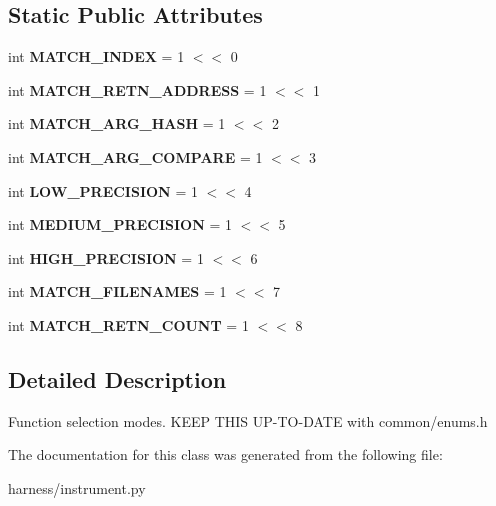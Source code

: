 \subsection*{Static Public Attributes}
\begin{DoxyCompactItemize}
\item 
\mbox{\label{classharness_1_1instrument_1_1_mode_add5468847be485ea5c5362ed9fec815b}} 
int {\bfseries M\+A\+T\+C\+H\+\_\+\+I\+N\+D\+EX} = 1 $<$$<$ 0
\item 
\mbox{\label{classharness_1_1instrument_1_1_mode_a361e316644f84d03585adabf031bb4ed}} 
int {\bfseries M\+A\+T\+C\+H\+\_\+\+R\+E\+T\+N\+\_\+\+A\+D\+D\+R\+E\+SS} = 1 $<$$<$ 1
\item 
\mbox{\label{classharness_1_1instrument_1_1_mode_a49e5431da8d0a3caa2901c6537d1e85a}} 
int {\bfseries M\+A\+T\+C\+H\+\_\+\+A\+R\+G\+\_\+\+H\+A\+SH} = 1 $<$$<$ 2
\item 
\mbox{\label{classharness_1_1instrument_1_1_mode_a3e45d63dc266f34a32296049643eb206}} 
int {\bfseries M\+A\+T\+C\+H\+\_\+\+A\+R\+G\+\_\+\+C\+O\+M\+P\+A\+RE} = 1 $<$$<$ 3
\item 
\mbox{\label{classharness_1_1instrument_1_1_mode_a70fe571b80851232c6535e54a5e5ab3a}} 
int {\bfseries L\+O\+W\+\_\+\+P\+R\+E\+C\+I\+S\+I\+ON} = 1 $<$$<$ 4
\item 
\mbox{\label{classharness_1_1instrument_1_1_mode_ad8d01d92c2decca424e8d779fc021c84}} 
int {\bfseries M\+E\+D\+I\+U\+M\+\_\+\+P\+R\+E\+C\+I\+S\+I\+ON} = 1 $<$$<$ 5
\item 
\mbox{\label{classharness_1_1instrument_1_1_mode_adfa506112e40e42fafbe47014f3488c1}} 
int {\bfseries H\+I\+G\+H\+\_\+\+P\+R\+E\+C\+I\+S\+I\+ON} = 1 $<$$<$ 6
\item 
\mbox{\label{classharness_1_1instrument_1_1_mode_a237be6b0ad1cc89919de41c689980550}} 
int {\bfseries M\+A\+T\+C\+H\+\_\+\+F\+I\+L\+E\+N\+A\+M\+ES} = 1 $<$$<$ 7
\item 
\mbox{\label{classharness_1_1instrument_1_1_mode_ace8ba0769932aafd48a8d80f067468b9}} 
int {\bfseries M\+A\+T\+C\+H\+\_\+\+R\+E\+T\+N\+\_\+\+C\+O\+U\+NT} = 1 $<$$<$ 8
\end{DoxyCompactItemize}


\subsection{Detailed Description}
\begin{DoxyVerb}Function selection modes.
KEEP THIS UP-TO-DATE with common/enums.h
\end{DoxyVerb}
 

The documentation for this class was generated from the following file\+:\begin{DoxyCompactItemize}
\item 
harness/instrument.\+py\end{DoxyCompactItemize}

